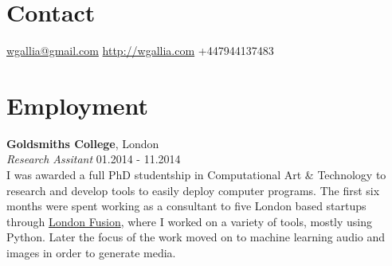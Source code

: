 \documentclass[margin,line,a4paper]{resume}
\begin{document}

\begin{resume}

\section{\mysidestyle Contact}

\hypersetup{urlcolor=Fuchsia}
\href{mailto:wgallia@gmail.com}{wgallia@gmail.com} \hfill
\hypersetup{urlcolor=RoyalBlue}
\href{http://wgallia.com}{http://wgallia.com} \hfill
+447944137483 \\


\section{\mysidestyle Employment}

\textbf{Goldsmiths College}, London \vspace{1mm}\\
\textsl{Research Assitant} \hfill 01.2014 - 11.2014 \vspace{2mm} \\
I was awarded a full PhD studentship in Computational Art \& Technology to research and develop tools to
easily deploy computer programs. The first six months were spent
working as a consultant to five London based startups through
\href{http://www.theworkfoundation.com/Aboutus/London-Creative-and-Digital-Fusion}{London
  Fusion}, where I worked on a variety of tools, mostly using Python. Later the
focus of the work moved on to machine learning audio and images in
order to generate media.





\end{resume}
\end{document}

